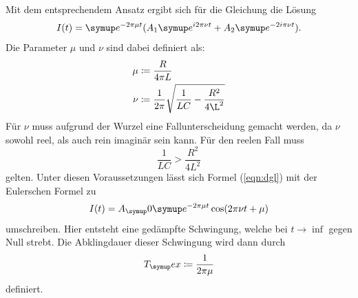 Mit dem entsprechendem Ansatz ergibt sich für die Gleichung die Lösung
\begin{equation}
  I(t)=\su{e}^{-2\pi\mu t}(A_1\su{e}^{i2\pi\nu t} + A_2\su{e}^{-2i\pi\nu t}).
  \label{eqn:dgl}
\end{equation}
Die Parameter $\mu$ und $\nu$ sind dabei definiert als:
\begin{align*}
  \mu &\coloneqq\frac{R}{4\pi L} \\
  \nu &\coloneqq\frac{1}{2\pi}\sqrt{\frac{1}{LC}-\frac{R^2}{4\L^2}}
\end{align*}
Für $\nu$ muss aufgrund der Wurzel eine Fallunterscheidung gemacht werden, da
$\nu$ sowohl reel, als auch rein imaginär sein kann.
Für den reelen Fall muss
\begin{equation*}
  \frac{1}{LC} > \frac{R^2}{4L^2}
\end{equation*}
gelten. Unter diesen Voraussetzungen lässt sich Formel (\ref{eqn:dgl}) mit der
Eulerschen Formel zu
\begin{equation}
  I(t)=A_\su{0}\su{e}^{-2\pi\mu t}\cos(2\pi\nu t+\mu)
\end{equation}
umschreiben. Hier entsteht eine gedämpfte Schwingung, welche bei $t\rightarrow\inf$
gegen Null strebt. Die Abklingdauer dieser Schwingung wird dann durch
\begin{equation}
  T_\su{ex}\coloneqq\frac{1}{2\pi\mu}
\end{equation}
definiert.

